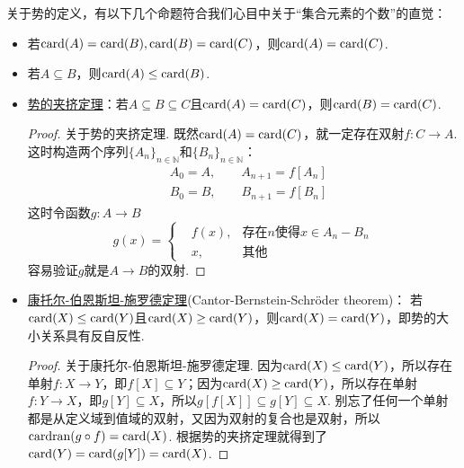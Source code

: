 关于势的定义，有以下几个命题符合我们心目中关于“集合元素的个数”的直觉：
\begin{itemize}
    \item [(1)] 若\({\rm card}(A)={\rm card}(B), {\rm card}(B)={\rm card}(C)\)，则\({\rm card}(A)={\rm card}(C)\).
    \item [(2)] 若\(A \subseteq B\)，则\({\rm card}(A) \leq {\rm card}(B)\).
    \item [(3)] \underline{势的夹挤定理}：若\(A \subseteq B \subseteq C\)且\({\rm card}(A) = {\rm card}(C)\)，则\({\rm card}(B) = {\rm card}(C)\).
        \begin{proof}
            关于势的夹挤定理. 既然\({\rm card}(A) = {\rm card}(C)\)，就一定存在双射\(f: C \to A\). 这时构造两个序列\(\{A_n\}_{n \in \mathbb{N}}\)和\(\{B_n\}_{n \in \mathbb{N}}\)：
            \begin{align*}
                & A_0 = A, \qquad A_{n+1} = f[A_n] \\
                & B_0 = B, \qquad B_{n+1} = f[B_n]
            \end{align*}
            这时令函数\(g: A \to B\)
            \[g(x) = \left\{
                \begin{aligned}
                    & f(x), &\mbox{存在}n\mbox{使得}x \in A_n - B_n \\
                    & x, &\mbox{其他}
                \end{aligned}
            \right. 
            \]
            容易验证\(g\)就是\(A \to B\)的双射.
        \end{proof}
    \item [(4)] \underline{康托尔-伯恩斯坦-施罗德定理}(Cantor-Bernstein-Schröder theorem)：
    \newline
    若\({\rm card}(X) \leq {\rm card}(Y)\)且\({\rm card}(X) \geq {\rm card}(Y)\)，则\({\rm card}(X) = {\rm card}(Y)\)，即势的大小关系具有反自反性.
    \begin{proof}
        关于康托尔-伯恩斯坦-施罗德定理. 因为\({\rm card}(X) \leq {\rm card}(Y)\)，所以存在单射\(f:X \to Y\)，即\(f[X] \subseteq Y\)；因为\({\rm card}(X) \geq {\rm card}(Y)\)，所以存在单射\(f:Y \to X\)，即\(g[Y] \subseteq X\)，所以\(g[f[X]] \subseteq g[Y] \subseteq X\). 别忘了任何一个单射都是从定义域到值域的双射，又因为双射的复合也是双射，所以\({\rm card} {\rm ran} (g \circ f) = {\rm card}(X)\). 根据势的夹挤定理就得到了\({\rm card}(Y) = {\rm card}(g[Y]) = {\rm card}(X)\).
    \end{proof}
\end{itemize}

